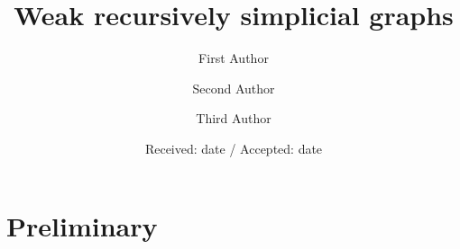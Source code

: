 \makeatletter
\newcommand*{\centernot}{%
  \mathpalette\@centernot
}
\def\@centernot#1#2{%
  \mathrel{%
    \rlap{%
      \settowidth\dimen@{$\m@th#1{#2}$}%
      \kern.5\dimen@
      \settowidth\dimen@{$\m@th#1=$}%
      \kern-.5\dimen@
      $\m@th#1\not$%
    }%
    {#2}%
  }%
}
\makeatother

%
%



\title{Weak recursively simplicial graphs
}


\author{First Author         \and
        Second Author \and
        Third Author
}



\date{Received: date / Accepted: date}

\maketitle

\section{Preliminary}

